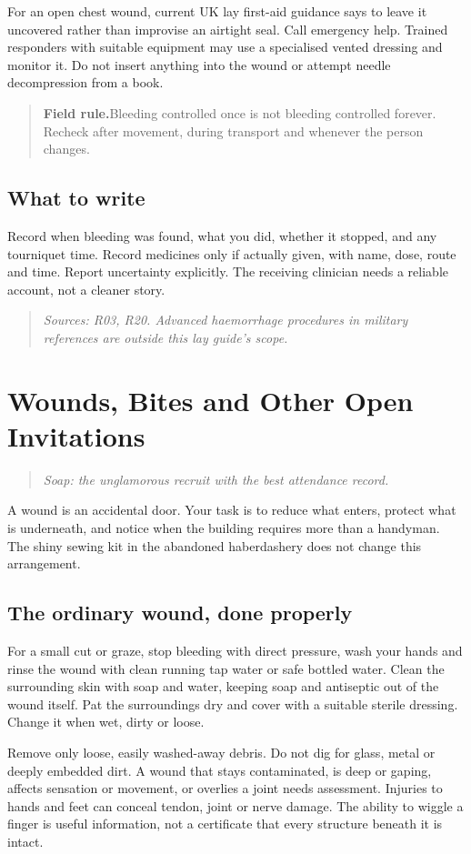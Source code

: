 \documentclass[10pt,openright]{book}
\newcommand{\fieldrule}[1]{\begin{quote}\textbf{Field rule.}\enspace #1\end{quote}}
\begin{document}
For an open chest wound, current UK lay first-aid guidance says to leave it uncovered rather than improvise an airtight seal. Call emergency help. Trained responders with suitable equipment may use a specialised vented dressing and monitor it. Do not insert anything into the wound or attempt needle decompression from a book.

\fieldrule{Bleeding controlled once is not bleeding controlled forever. Recheck after movement, during transport and whenever the person changes.}
\section*{What to write}
Record when bleeding was found, what you did, whether it stopped, and any tourniquet time. Record medicines only if actually given, with name, dose, route and time. Report uncertainty explicitly. The receiving clinician needs a reliable account, not a cleaner story.

\begin{quote}\emph{Sources: R03, R20. Advanced haemorrhage procedures in military references are outside this lay guide's scope.}\end{quote}
\chapter{Wounds, Bites and Other Open Invitations}
\begin{quote}\emph{Soap: the unglamorous recruit with the best attendance record.}\end{quote}
A wound is an accidental door. Your task is to reduce what enters, protect what is underneath, and notice when the building requires more than a handyman. The shiny sewing kit in the abandoned haberdashery does not change this arrangement.

\section*{The ordinary wound, done properly}
For a small cut or graze, stop bleeding with direct pressure, wash your hands and rinse the wound with clean running tap water or safe bottled water. Clean the surrounding skin with soap and water, keeping soap and antiseptic out of the wound itself. Pat the surroundings dry and cover with a suitable sterile dressing. Change it when wet, dirty or loose.

Remove only loose, easily washed-away debris. Do not dig for glass, metal or deeply embedded dirt. A wound that stays contaminated, is deep or gaping, affects sensation or movement, or overlies a joint needs assessment. Injuries to hands and feet can conceal tendon, joint or nerve damage. The ability to wiggle a finger is useful information, not a certificate that every structure beneath it is intact.
\end{document}
